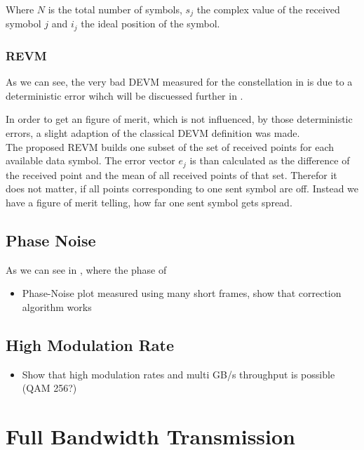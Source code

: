 Where $N$ is the total number of symbols, $s_j$ the complex value of the
received symobol $j$ and $i_j$ the ideal position of the symbol. \\

\subsubsection{\acrfull{REVM}}
As we can see, the very bad \gls{DEVM} measured for the constellation in
 is due to a deterministic error wihch will
be discuessed further in .

In order to get an figure of merit, which is not influenced, by those deterministic
errors, a slight adaption of the classical \gls{DEVM} definition was made. \\

The proposed \acrfull{REVM} builds one subset of the set of received points for
each available data symbol. The error vector $e_j$ is than calculated as the
difference of the received point and the mean of all received points of that
set. Therefor it does not matter, if all points corresponding to one sent symbol
are off. Instead we have a figure of merit telling, how far one sent symbol gets
spread. \\

\subsection{Phase Noise}
\label{sec:res_450_phase}

As we can see in \figref{}, where the phase of

\begin{itemize}
\item Phase-Noise plot measured using many short frames, show that correction algorithm works
\end{itemize}

\subsection{High Modulation Rate}
\begin{itemize}
\item Show that high modulation rates and multi GB/s throughput is possible (\gls{QAM} 256?)
\end{itemize}

\section{Full Bandwidth Transmission}
